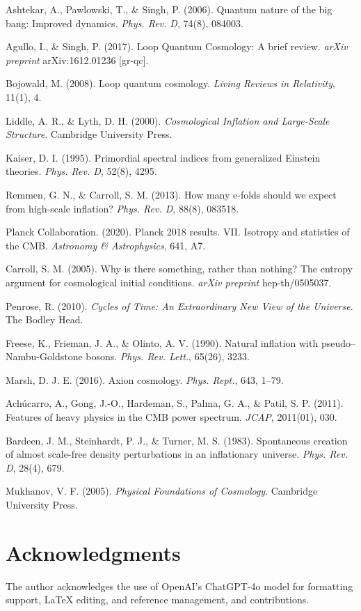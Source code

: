 \documentclass[12pt]{article}
\begin{document}
\begin{thebibliography}{99}

Ashtekar, A., Pawlowski, T., \& Singh, P. (2006). Quantum nature of the big bang: Improved dynamics. \textit{Phys. Rev. D}, 74(8), 084003.

Agullo, I., \& Singh, P. (2017). Loop Quantum Cosmology: A brief review. \textit{arXiv preprint} arXiv:1612.01236 [gr-qc].

Bojowald, M. (2008). Loop quantum cosmology. \textit{Living Reviews in Relativity}, 11(1), 4.

Liddle, A. R., \& Lyth, D. H. (2000). \textit{Cosmological Inflation and Large-Scale Structure}. Cambridge University Press.

Kaiser, D. I. (1995). Primordial spectral indices from generalized Einstein theories. \textit{Phys. Rev. D}, 52(8), 4295.

Remmen, G. N., \& Carroll, S. M. (2013). How many e-folds should we expect from high-scale inflation? \textit{Phys. Rev. D}, 88(8), 083518.

Planck Collaboration. (2020). Planck 2018 results. VII. Isotropy and statistics of the CMB. \textit{Astronomy \& Astrophysics}, 641, A7.

Carroll, S. M. (2005). Why is there something, rather than nothing? The entropy argument for cosmological initial conditions. \textit{arXiv preprint} hep-th/0505037.

Penrose, R. (2010). \textit{Cycles of Time: An Extraordinary New View of the Universe}. The Bodley Head.

Freese, K., Frieman, J. A., \& Olinto, A. V. (1990). Natural inflation with pseudo–Nambu-Goldstone bosons. \textit{Phys. Rev. Lett.}, 65(26), 3233.

Marsh, D. J. E. (2016). Axion cosmology. \textit{Phys. Rept.}, 643, 1–79.

Achúcarro, A., Gong, J.-O., Hardeman, S., Palma, G. A., \& Patil, S. P. (2011). Features of heavy physics in the CMB power spectrum. \textit{JCAP}, 2011(01), 030.

Bardeen, J. M., Steinhardt, P. J., \& Turner, M. S. (1983). Spontaneous creation of almost scale-free density perturbations in an inflationary universe. \textit{Phys. Rev. D}, 28(4), 679.

Mukhanov, V. F. (2005). \textit{Physical Foundations of Cosmology}. Cambridge University Press.

\end{thebibliography}

\section*{Acknowledgments}
The author acknowledges the use of OpenAI's ChatGPT-4o model for formatting support, LaTeX editing, and reference management, and contributions.
\end{document}
